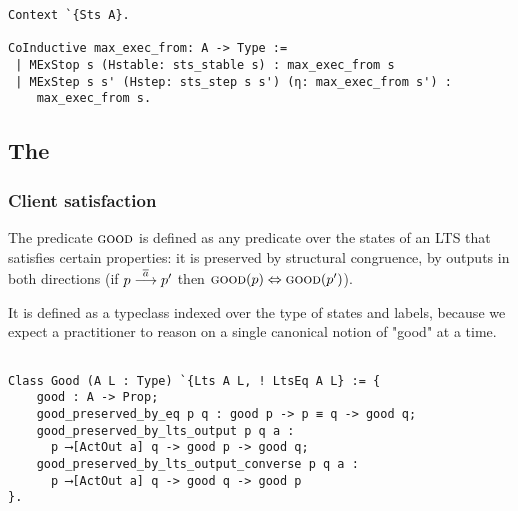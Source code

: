 \begin{mdframed}
\begin{verbatim}
Context `{Sts A}.

CoInductive max_exec_from: A -> Type :=
 | MExStop s (Hstable: sts_stable s) : max_exec_from s
 | MExStep s s' (Hstep: sts_step s s') (η: max_exec_from s') :
    max_exec_from s.
\end{verbatim}
\end{mdframed}


\subsection{The \mustpreorder}

\subsubsection{Client satisfaction}

The predicate $\textsc{good}$ is defined as any predicate over the states
of an LTS that satisfies certain properties: it is preserved by
structural congruence, by outputs in both directions
(if $p \mathrel{\overset{\overline{a}}\longrightarrow} p'$ then $\textsc{good}(p) \Leftrightarrow \textsc{good}(p')$).

It is defined as a typeclass indexed over the type of states and
labels, because we expect a practitioner %
to reason on a single canonical notion of "good" at a time.

\begin{mdframed}
\begin{verbatim}

Class Good (A L : Type) `{Lts A L, ! LtsEq A L} := {
    good : A -> Prop;
    good_preserved_by_eq p q : good p -> p ≡ q -> good q;
    good_preserved_by_lts_output p q a :
      p ⟶[ActOut a] q -> good p -> good q;
    good_preserved_by_lts_output_converse p q a :
      p ⟶[ActOut a] q -> good q -> good p
}.

\end{verbatim}
\end{mdframed}

